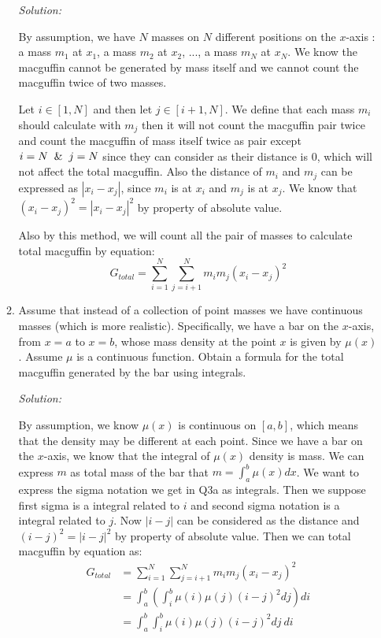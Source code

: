 \documentclass[12pt]{exam}
\begin{document}
\begin{enumerate}
\begin{enumerate}
	\emph{Solution:}
	
	By assumption, we have $N$ masses on $N$ different positions on the $x$-axis : a mass $m_1$ at $x_1$, a mass $m_2$ at $x_2$, ..., a mass $m_N$ at $x_N$. We know the macguffin cannot be generated by mass itself and we cannot count the macguffin twice of two masses.
	
	Let $i\in [1, N]$ and then let $j\in [i+1, N]$. We define that each mass $m_i$ should calculate with $m_j$ then it will not count the macguffin pair twice and count the macguffin of mass itself twice as pair except $i=N \And j=N$ since they can consider as their distance is $0$, which will not affect the total macguffin. Also the distance of $m_i$ and $m_j$ can be expressed as $|x_i-x_j|$, since $m_i$ is at $x_i$ and $m_j$ is at $x_j$. We know that $(x_i-x_j)^2=|x_i-x_j|^2$ by property of absolute value.
	
	Also by this method, we will count all the pair of masses to calculate total macguffin by equation:
	$$
	    G_{total}=\sum_{i=1}^{N}\sum_{j=i+1}^{N}m_im_j(x_i-x_j)^2
	$$
	
	\newpage
	
	\item  Assume that instead of a collection of point masses we have continuous masses (which is more realistic).  Specifically, we have a bar on the $x$-axis, from $x=a$ to $x=b$, whose mass density at the point $x$ is given by $\mu(x)$.  Assume $\mu$ is a continuous function.  Obtain a formula for the total macguffin generated by the bar using integrals.
	
	\emph{Solution:}
	
	By assumption, we know $\mu(x)$ is continuous on $[a, b]$, which means that the density may be different at each point. Since we have a bar on the $x$-axis, we know that the integral of $\mu(x)$ density is mass. We can express $m$ as total mass of the bar that $m=\int_a^b\mu(x)dx$. We want to express the sigma notation we get in Q3a as integrals. Then we suppose first sigma is a integral related to $i$ and second sigma notation is a integral related to $j$. Now $|i-j|$ can be considered as the distance and $(i-j)^2=|i-j|^2$ by property of absolute value.
	Then we can total macguffin by equation as:
	\begin{align*}
	    G_{total}&=\sum_{i=1}^{N}\sum_{j=i+1}^{N}m_im_j(x_i-x_j)^2\\
	    &=\int_a^b(\int_i^b\mu(i)\mu(j)(i-j)^2dj)di\\
	    &=\int_a^b\int_i^b\mu(i)\mu(j)(i-j)^2dj\ di
	\end{align*}
	
\end{enumerate}



\end{enumerate}
\end{document}
